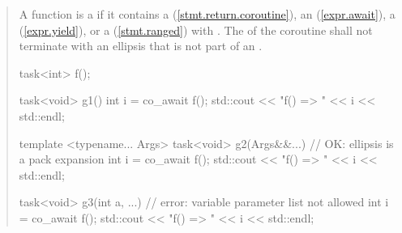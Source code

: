 \begin{quote}
\pnum
A function is a  if it contains a  (\ref{stmt.return.coroutine}),  an  (\ref{expr.await}), a  (\ref{expr.yield}), or a  (\ref{stmt.ranged}) with .
The  of the coroutine shall not terminate with an ellipsis that is not part of an . 




\pnum
\enterexample
\begin{codeblock}
  task<int> f();
  
  task<void> g1() {
    int i = co_await f();
    std::cout << "f() => " << i << std::endl;
  }

  template <typename... Args>
  task<void> g2(Args&&...) { // OK: ellipsis is a pack expansion
    int i = co_await f();
    std::cout << "f() => " << i << std::endl;
  }

  task<void> g3(int a, ...) { // error: variable parameter list not allowed
    int i = co_await f();
    std::cout << "f() => " << i << std::endl;
  }

\end{codeblock}
\exitexample
%
%  
%    



\end{quote}
